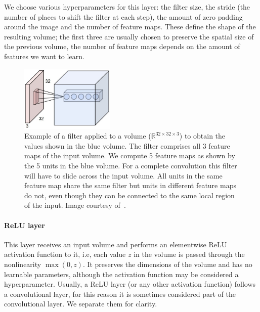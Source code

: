 We choose various hyperparameters for this layer: the filter size, the stride (the number of places to shift the filter at each step), the amount of zero padding around the image and the number of feature maps. These define the shape of the resulting volume; the first three are usually chosen to preserve the spatial size of the previous volume, the number of feature maps depends on the amount of features we want to learn.
\begin{figure}[h]
	\centering
	\includegraphics[width = 0.4\textwidth]{plots/convLayer.jpeg}
	\caption[Example of a filter in a convolutional layer]{Example of a filter applied to a volume ($\mathbb{R}^{32\times 32\times 3}$) to obtain the values shown in the blue volume. The filter comprises all 3 feature maps of the input volume. We compute 5 feature maps as shown by the 5 units in the blue volume. For a complete convolution this filter will have to slide across the input volume. All units in the same feature map share the same filter but units in different feature maps do not, even though they can be connected to the same local region of the input. Image courtesy of~\cite{Karpathy2015}.}
	\label{fig:ConvLayer}
\end{figure}

\paragraph{ReLU layer} This layer receives an input volume and performs an elementwise ReLU activation function to it, i.e, each value $z$ in the volume is passed through the nonlinearity $\max(0,z)$. It preserves the dimensions of the volume and has no learnable parameters, although the activation function may be considered a hyperparameter. Usually, a ReLU layer (or any other activation function) follows a convolutional layer, for this reason it is sometimes considered part of the convolutional layer. We separate them for clarity.


